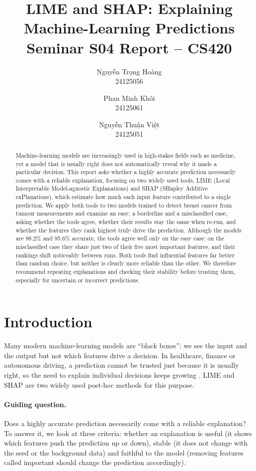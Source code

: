 \documentclass[11pt,a4paper]{article}
\title{\textbf{LIME and SHAP: Explaining Machine-Learning Predictions}\\[2pt]\large Seminar S04 Report -- CS420}
\author{%
  Nguyễn Trọng Hoàng\\ \small 24125056 \and
  Phan Minh Khôi\\ \small 24125061 \and
  Nguyễn Thuận Việt\\ \small 24125051%
}
\date{}
\begin{document}
\maketitle

\begin{abstract}
Machine-learning models are increasingly used in high-stakes fields such as
medicine, yet a model that is usually right does not automatically reveal why
it made a particular decision. This report asks whether a highly accurate
prediction necessarily comes with a reliable explanation, focusing on two
widely used tools, LIME (Local Interpretable Model-agnostic Explanations) and
SHAP (SHapley Additive exPlanations), which estimate how much each input
feature contributed to a single prediction. We apply both tools to two models
trained to detect breast cancer from tumour measurements and examine an easy,
a borderline and a misclassified case, asking whether the tools agree, whether
their results stay the same when re-run, and whether the features they rank
highest truly drive the prediction. Although the models are 98.2\% and 95.6\%
accurate, the tools agree well only on the easy case: on the misclassified
case they share just two of their five most important features, and their
rankings shift noticeably between runs. Both tools find influential features
far better than random choice, but neither is clearly more reliable than the
other. We therefore recommend repeating explanations and checking their
stability before trusting them, especially for uncertain or incorrect
predictions.
\end{abstract}

\section{Introduction}

Many modern machine-learning models are ``black boxes'': we see the input and
the output but not which features drive a decision. In healthcare, finance or
autonomous driving, a prediction cannot be trusted just because it is usually
right, so the need to explain individual decisions keeps growing
\cite{ribeiro}\cite{mersha}. LIME \cite{ribeiro} and SHAP \cite{lundberg} are
two widely used post-hoc methods for this purpose.

\paragraph{Guiding question.} Does a highly accurate prediction necessarily
come with a reliable explanation? To answer it, we look at three
criteria: whether an explanation is useful (it shows which features push the
prediction up or down), stable (it does not change with the seed or the
background data) and faithful to the model (removing features called important
should change the prediction accordingly).
\end{document}
